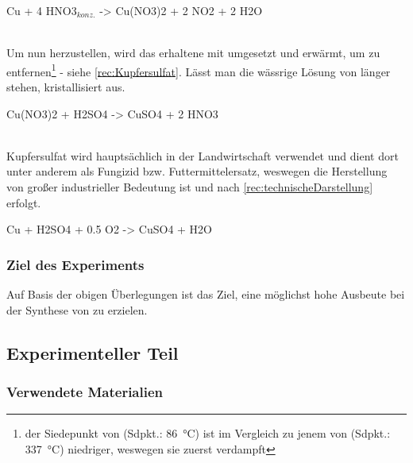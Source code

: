 \documentclass{article}
\begin{document}
        \begin{reaction}
          Cu\sld{} + 4 HNO3\aq$_{konz.}$ -> Cu(NO3)2\aq{} + 2 NO2\gas{} + 2 H2O \label{rec:LosenKupferzwei}
        \end{reaction} \\
        
        Um nun  herzustellen, wird das erhaltene  mit  umgesetzt und erwärmt, um  zu entfernen\footnote{der Siedepunkt von  (Sdpkt.: \SI[mode=text]{86}{\degreeCelsius}) ist im Vergleich zu jenem von  (Sdpkt.: \SI[mode=text]{337}{\degreeCelsius}) niedriger, weswegen sie zuerst verdampft} - siehe \ref{rec:Kupfersulfat}. Lässt man die wässrige Lösung von  länger stehen, kristallisiert  aus.
        
        \begin{reaction}
          Cu(NO3)2\aq{} + H2SO4\aq{} -> CuSO4\aq{} + 2 HNO3\aq \label{rec:Kupfersulfat}
        \end{reaction} \\
         
        Kupfersulfat wird hauptsächlich in der Landwirtschaft verwendet und dient dort unter anderem als Fungizid bzw. Futtermittelersatz, weswegen die Herstellung von großer industrieller Bedeutung ist und nach \ref{rec:technischeDarstellung} erfolgt.
        
        \begin{reaction}
          Cu\sld{} + H2SO4\aq{} + 0.5 O2\gas{} -> CuSO4\aq{} + H2O \label{rec:technischeDarstellung}
        \end{reaction}
        
   
      \subsubsection{Ziel des Experiments}
    
        Auf Basis der obigen Überlegungen ist das Ziel, eine möglichst hohe Ausbeute bei der Synthese von  zu erzielen.
    
    \subsection{Experimenteller Teil}
  
      \subsubsection{Verwendete Materialien}
              
\end{document}
